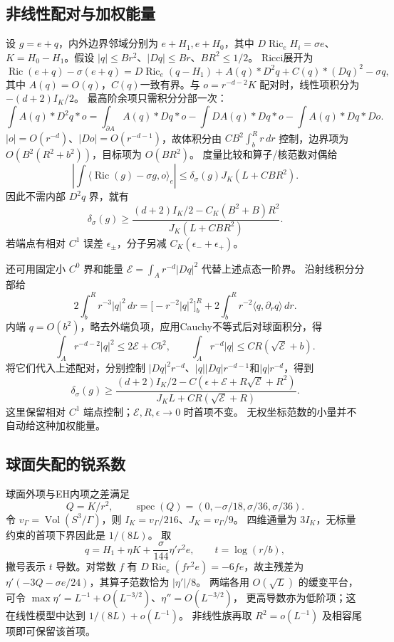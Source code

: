 \documentclass[UTF8,a4paper,11pt,fontset=fandol]{ctexart}
\numberwithin{equation}{section}
\theoremstyle{definition}
\newcommand{\Ric}{\operatorname{Ric}}
\newcommand{\Vol}{\operatorname{Vol}}
\begin{document}
\subsection{非线性配对与加权能量}
设 $g=e+q$，内外边界邻域分别为 $e+H_1,e+H_0$，其中
$D\Ric_eH_i=\sigma e$、$K=H_0-H_1$。假设
$|q|\le Br^2$、$|Dq|\le Br$、$BR^2\le1/2$。
Ricci展开为
\[
\Ric(e+q)-\sigma(e+q)=D\Ric_e(q-H_1)
+A(q)*D^2q+C(q)*(Dq)^2-\sigma q,
\]
其中 $A(q)=O(q)$，$C(q)$一致有界。与 $o=r^{-d-2}K$ 配对时，线性项积分为 $-(d+2)I_K/2$。
最高阶余项只需积分分部一次：
\[
\int A(q)*D^2q*o
=\int_{\partial A}A(q)*Dq*o
-\int DA(q)*Dq*o-\int A(q)*Dq*Do.
\]
$|o|=O(r^{-d})$、$|Do|=O(r^{-d-1})$，故体积分由
$CB^2\int_b^Rr\,dr$ 控制，边界项为 $O(B^2(R^2+b^2))$，目标项为 $O(BR^2)$。
度量比较和算子/核范数对偶给
\[
\left|\int\langle\Ric(g)-\sigma g,o\rangle_e\right|
\le\delta_\sigma(g)J_K(L+CBR^2).
\]
因此不需内部 $D^2q$ 界，就有
\begin{equation}\label{eq:nonlinearflux}
\delta_\sigma(g)\ge
\frac{(d+2)I_K/2-C_K(B^2+B)R^2}
{J_K(L+CBR^2)}.
\end{equation}
若端点有相对 $C^1$ 误差 $\epsilon_\pm$，分子另减 $C_K(\epsilon_-+\epsilon_+)$。

还可用固定小 $C^0$ 界和能量
$\mathcal E=\int_A r^{-d}|Dq|^2$ 代替上述点态一阶界。
沿射线积分分部给
\[
2\int_b^Rr^{-3}|q|^2\,dr
=\bigl[-r^{-2}|q|^2\bigr]_b^R+
2\int_b^Rr^{-2}\langle q,\partial_rq\rangle\,dr.
\]
内端 $q=O(b^2)$，略去外端负项，应用Cauchy不等式后对球面积分，得
\[
\int_A r^{-d-2}|q|^2\le2\mathcal E+Cb^2,\qquad
\int_A r^{-d}|q|\le CR(\sqrt{\mathcal E}+b).
\]
将它们代入上述配对，分别控制
$|Dq|^2r^{-d}$、$|q||Dq|r^{-d-1}$和$|q|r^{-d}$，得到
\begin{equation}\label{eq:energyflux}
\delta_\sigma(g)\ge
\frac{(d+2)I_K/2-C(\epsilon+\mathcal E+R\sqrt{\mathcal E}+R^2)}
{J_KL+CR(\sqrt{\mathcal E}+R)}.
\end{equation}
这里保留相对 $C^1$ 端点控制；$\mathcal E,R,\epsilon\to0$ 时首项不变。
无权坐标范数的小量并不自动给这种加权能量。

\subsection{球面失配的锐系数}
球面外项与EH内项之差满足
\[
Q=K/r^2,\qquad \operatorname{spec}(Q)=(0,-\sigma/18,\sigma/36,\sigma/36).
\]
令 $v_\Gamma=\Vol(S^3/\Gamma)$，则
$I_K=v_\Gamma/216$、$J_K=v_\Gamma/9$。
四维通量为 $3I_K$，无标量约束的首项下界因此是 $1/(8L)$。
取
\[
q=H_1+\eta K+\frac{\sigma}{144}\eta' r^2e,\qquad t=\log(r/b),
\]
撇号表示 $t$ 导数。对常数 $f$ 有
$D\Ric_e(fr^2e)=-6f e$，故主残差为
$\eta'(-3Q-\sigma e/24)$，其算子范数恰为 $|\eta'|/8$。
两端各用 $O(\sqrt L)$ 的缓变平台，可令
$\max\eta'=L^{-1}+O(L^{-3/2})$、$\eta''=O(L^{-3/2})$，
更高导数亦为低阶项；这在线性模型中达到 $1/(8L)+o(L^{-1})$。
非线性族再取 $R^2=o(L^{-1})$ 及相容尾项即可保留该首项。
\end{document}
